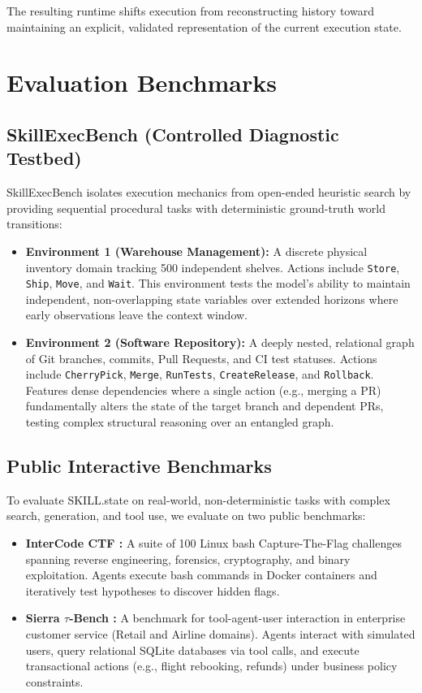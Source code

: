 \documentclass[11pt]{article}
\begin{document}
The resulting runtime shifts execution from reconstructing history toward maintaining an explicit, validated representation of the current execution state.


\section{Evaluation Benchmarks}
\label{sec:benchmarks}

\subsection{SkillExecBench (Controlled Diagnostic Testbed)}
\label{subsec:skillexecbench}

SkillExecBench isolates execution mechanics from open-ended heuristic search by providing sequential procedural tasks with deterministic ground-truth world transitions:
\begin{itemize}[leftmargin=*]
    \item \textbf{Environment 1 (Warehouse Management):} A discrete physical inventory domain tracking 500 independent shelves. Actions include \texttt{Store}, \texttt{Ship}, \texttt{Move}, and \texttt{Wait}. This environment tests the model's ability to maintain independent, non-overlapping state variables over extended horizons where early observations leave the context window.
    \item \textbf{Environment 2 (Software Repository):} A deeply nested, relational graph of Git branches, commits, Pull Requests, and CI test statuses. Actions include \texttt{CherryPick}, \texttt{Merge}, \texttt{RunTests}, \texttt{CreateRelease}, and \texttt{Rollback}. Features dense dependencies where a single action (e.g., merging a PR) fundamentally alters the state of the target branch and dependent PRs, testing complex structural reasoning over an entangled graph.
\end{itemize}

\subsection{Public Interactive Benchmarks}
\label{subsec:public_benchmarks}

To evaluate SKILL.state on real-world, non-deterministic tasks with complex search, generation, and tool use, we evaluate on two public benchmarks:
\begin{itemize}[leftmargin=*]
    \item \textbf{InterCode CTF \citep{yang2023intercode}:} A suite of 100 Linux bash Capture-The-Flag challenges spanning reverse engineering, forensics, cryptography, and binary exploitation. Agents execute bash commands in Docker containers and iteratively test hypotheses to discover hidden flags.
    \item \textbf{Sierra $\tau$-Bench \citep{yao2024tau}:} A benchmark for tool-agent-user interaction in enterprise customer service (Retail and Airline domains). Agents interact with simulated users, query relational SQLite databases via tool calls, and execute transactional actions (e.g., flight rebooking, refunds) under business policy constraints.
\end{itemize}
\end{document}
